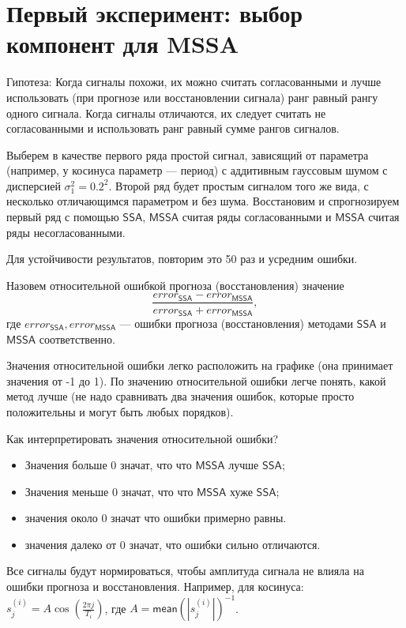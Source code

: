 \documentclass[specialist, substylefile = spbureport.rtx,
    subf,href,colorlinks=true, 12pt]{disser}
\newcommand{\SSA}{\mathsf{SSA}}
\newcommand{\MSSA}{\mathsf{MSSA}}
\newcommand{\mean}{\mathsf{mean}}
\begin{document}
    \section{Первый эксперимент: выбор компонент для MSSA}
        Гипотеза: Когда сигналы похожи, их можно считать согласованными и лучше использовать (при прогнозе или восстановлении сигнала) ранг равный рангу одного сигнала. Когда сигналы отличаются, их следует считать не согласованными и использовать ранг равный сумме рангов сигналов.

        Выберем в качестве первого ряда простой сигнал, зависящий от параметра (например, у косинуса параметр --- период) с аддитивным гауссовым шумом с дисперсией $\sigma_1^2 = 0.2^2$.
        Второй ряд будет простым сигналом того же вида, с несколько отличающимся параметром и без шума.
        Восстановим и спрогнозируем первый ряд с помощью $\SSA$, $\MSSA$ считая ряды согласованными и $\MSSA$ считая ряды несогласованными.

        Для устойчивости результатов, повторим это 50 раз и усредним ошибки.

        Назовем относительной ошибкой прогноза (восстановления) значение $$\displaystyle \frac{error_{\SSA} - error_{\MSSA}}{error_{\SSA} + error_{\MSSA}},$$ где $error_{\SSA}, error_{\MSSA}$ --- ошибки прогноза (восстановления) методами $\SSA$ и $\MSSA$ соответственно.
        
        Значения относительной ошибки легко расположить на графике (она принимает значения от -1 до 1). По значению относительной ошибки легче понять, какой метод лучше (не надо сравнивать два значения ошибок, которые просто положительны и могут быть любых порядков).
        
        Как интерпретировать значения относительной ошибки? 
        \begin{itemize}
            \item Значения больше $0$ значат, что что $\MSSA$ лучше $\SSA$;
            \item Значения меньше $0$ значат, что что $\MSSA$ хуже $\SSA$;
            \item значения около $0$ значат что ошибки примерно равны.
            \item значения далеко от $0$ значат, что ошибки сильно отличаются.
        \end{itemize}

        Все сигналы будут нормироваться, чтобы амплитуда сигнала не влияла на ошибки прогноза и восстановления. Например, для косинуса: $s_j^{(i)} = A \cos(\frac{2\pi j}{T_i})$, где $A = \mean(|s_j^{(i)}|)^{-1}$.
\end{document}
